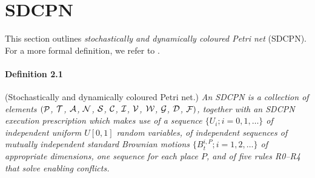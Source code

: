 \documentclass[copyright,creativecommons]{eptcs}
\begin{document}
\section{SDCPN}\label{sec:sdcpn}
This section outlines \emph{stochastically and
dynamically coloured Petri net} (SDCPN). For a more formal
definition, we refer to \cite{EverdijBlom2009}.

\paragraph{Definition 2.1} (Stochastically and dynamically coloured Petri net.)
\emph{An SDCPN is a collection of elements $({\cal P}$, ${\cal T}$,
${\cal A}$, ${\cal N}$, ${\cal S}$, ${\cal C}$, ${\cal I}$, ${\cal
V}$, ${\cal W}$, ${\cal G}$, ${\cal D}$, ${\cal F})$, together
with an SDCPN execution prescription which makes use of a sequence
$\{U_i ; i = 0, 1, \ldots \}$ of independent uniform $U[0,1]$
random variables, of independent sequences of mutually independent
standard Brownian motions $\{B_{t}^{i, P} ; i = 1, 2, \ldots \}$
of appropriate dimensions, one sequence for each place $P$, and of
five rules R0--R4 that solve enabling conflicts.}
\end{document}
